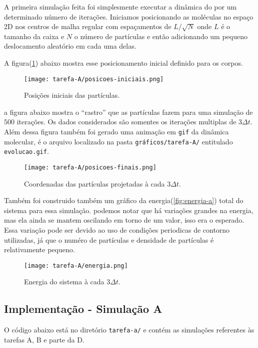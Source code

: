 A primeira simulação feita foi simplesmente executar a dinâmica do por um 
determinado número de iterações. Iniciamos posicionando as moléculas no espaço 
2D nos centros de malha regular com espaçamentos de $L/\sqrt{N}$ onde $L$ é o tamanho da 
caixa e $N$ o número de partículas e então adicionando um pequeno deslocamento aleatório
em cada uma delas. 

A figura(\ref{fig:posicoes-iniciais-a}) abaixo mostra esse posicionamento inicial definido para os corpos.

\begin{figure}[h!]
    \centering
    \texttt{[image: tarefa-A/posicoes-iniciais.png]}
    \caption{Posições iniciais das partículas.}
    \label{fig:posicoes-iniciais-a}
\end{figure}

a figura abaixo mostra o  ``rastro'' que as partículas fazem para uma simulação de $500$ iterações. 
Os dados considerados são somentes os iterações multiplas de $3 \Delta t$. Além dessa figura 
também foi gerado uma animação em \verb|gif| da dinâmica molecular, é o arquivo 
localizado na pasta \verb|gráficos/tarefa-A/| entitulado \verb|evolucao.gif|.  

\begin{figure}[h!]
    \centering 
    \texttt{[image: tarefa-A/posicoes-finais.png]}
    \label{fig:posicoes-finais-a}
    \caption{Coordenadas das partículas projetadas à cada $3 \Delta t$.}
\end{figure}


Também foi construido também um gráfico da energia(\ref{fig:energia-a}) total do sistema para essa simulação.
podemos notar que há variações grandes na energia, mas ela ainda se mantem oscilando em torno de um valor, isso era o esperado. 
Essa variação pode ser devido ao uso de condições periodicas de contorno utilizadas, já que o numéro de partículas e densidade de partículas 
é relativamente pequeno.

\begin{figure}[h!]
    \centering 
    \texttt{[image: tarefa-A/energia.png]}
    \caption{Energia do sistema à cada $3 \Delta t$.}
    \label{fig:energia_a}
\end{figure}

\clearpage
\subsection{Implementação - Simulação A}
\label{ssec:codigoA}
O código abaixo está no diretório \verb|tarefa-a/| e contém 
as simulações referentes às tarefas A, B e parte da D.

\clearpage